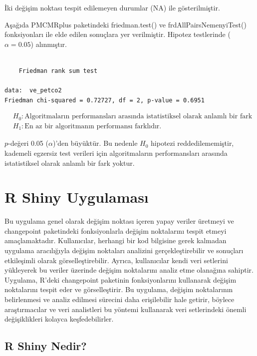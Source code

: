 \documentclass[12pt,twoside]{deuthesis}
\begin{document}
İki değişim noktası tespit edilemeyen durumlar (NA) ile gösterilmiştir.

Aşağıda PMCMRplus paketindeki friedman.test() ve frdAllPairsNemenyiTest() fonksiyonları ile elde edilen sonuçlara yer verilmiştir. Hipotez testlerinde (\(\alpha=0.05\)) alınmıştır.

\begin{verbatim}

    Friedman rank sum test

data:  ve_petco2
Friedman chi-squared = 0.72727, df = 2, p-value = 0.6951
\end{verbatim}

\begin{align*}
&H_0:\text{Algoritmaların performansları arasında istatistiksel olarak anlamlı bir fark yoktur.} \\
&H_1:\text{En az bir algoritmanın performansı farklıdır.}
\end{align*}

\(p\)-değeri 0.05 (\(\alpha\))'den büyüktür. Bu nedenle \(H_0\) hipotezi reddedilememiştir, kademeli egzersiz test verileri için algoritmaların performansları arasında istatistiksel olarak anlamlı bir fark yoktur.

\section{R Shiny Uygulaması}\label{r-shiny-uygulamasux131}

Bu uygulama genel olarak değişim noktası içeren yapay veriler üretmeyi ve changepoint paketindeki fonksiyonlarla değişim noktalarını tespit etmeyi amaçlamaktadır. Kullanıcılar, herhangi bir kod bilgisine gerek kalmadan uygulama aracılığıyla değişim noktaları analizini gerçekleştirebilir ve sonuçları etkileşimli olarak görselleştirebilir. Ayrıca, kullanıcılar kendi veri setlerini yükleyerek bu veriler üzerinde değişim noktalarını analiz etme olanağına sahiptir. Uygulama, R'deki changepoint paketinin fonksiyonlarını kullanarak değişim noktalarını tespit eder ve görselleştirir. Bu uygulama, değişim noktalarının belirlenmesi ve analiz edilmesi sürecini daha erişilebilir hale getirir, böylece araştırmacılar ve veri analistleri bu yöntemi kullanarak veri setlerindeki önemli değişiklikleri kolayca keşfedebilirler.

\subsection{R Shiny Nedir?}\label{r-shiny-nedir}
\end{document}
